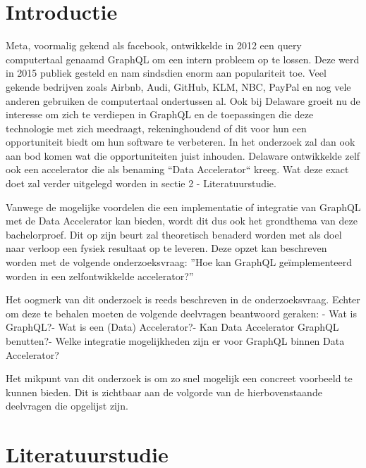 
\section{Introductie}%
\label{sec:introductie}

Meta, voormalig gekend als facebook, ontwikkelde in 2012 een query computertaal genaamd GraphQL om een intern probleem op te lossen. Deze werd in 2015 publiek gesteld en nam sindsdien enorm aan populariteit toe. Veel gekende bedrijven zoals Airbnb, Audi, GitHub, KLM, NBC, PayPal en nog vele anderen gebruiken de computertaal ondertussen al. Ook bij Delaware groeit nu de interesse om zich te verdiepen in GraphQL en de toepassingen die deze technologie met zich meedraagt, rekeninghoudend of dit voor hun een opportuniteit biedt om hun software te verbeteren. In het onderzoek zal dan ook aan bod komen wat die opportuniteiten juist inhouden. Delaware ontwikkelde zelf ook een accelerator die als benaming “Data Accelerator“ kreeg. Wat deze exact doet zal verder uitgelegd worden in sectie 2 - Literatuurstudie.

Vanwege de mogelijke voordelen die een implementatie of integratie van GraphQL met de Data Accelerator kan bieden, wordt dit dus ook het grondthema van deze bachelorproef. Dit op zijn beurt zal theoretisch benaderd worden met als doel naar verloop een fysiek resultaat op te leveren. Deze opzet kan beschreven worden met de volgende onderzoeksvraag: ''Hoe kan GraphQL geïmplementeerd worden in een zelfontwikkelde accelerator?''

Het oogmerk van dit onderzoek is reeds beschreven in de onderzoeksvraag. Echter om deze te behalen moeten de volgende deelvragen beantwoord geraken: \newline - Wat is GraphQL?\newline - Wat is een (Data) Accelerator?\newline - Kan Data Accelerator GraphQL benutten?\newline - Welke integratie mogelijkheden zijn er voor GraphQL binnen Data Accelerator?

Het mikpunt van dit onderzoek is om zo snel mogelijk een concreet voorbeeld te kunnen bieden. Dit is zichtbaar aan de volgorde van de hierbovenstaande deelvragen die opgelijst zijn.



\section{Literatuurstudie}%
\label{sec:Literatuurstudie}

